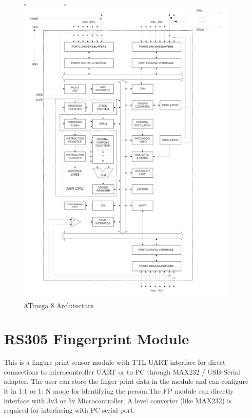 \documentclass[twoside,a4paper,16pt]{book}
\begin{document}
{{\begin{figure}[ht!]
	\begin{center}
		\includegraphics[width=15.0cm]{10.png}
		\caption{ATmega 8 Architecture}
	\end{center}
\end{figure}
\section{RS305 Fingerprint Module }
This is a fingure print sensor module with TTL UART interface for direct connections to microcontroller UART or to PC through MAX232 / USB-Serial adapter. The user can store the finger print data in the module and can configure it in 1:1 or 1: N mode for identifying the person.The FP module can directly interface with 3v3 or 5v Microcontroller. A level converter (like MAX232) is required for interfacing with PC serial port.

}}
\end{document}
